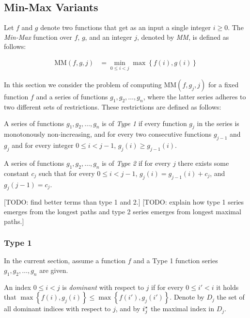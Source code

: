 \subsection{Min-Max Variants}

Let $f$ and $g$ denote two functions that get as an input a single integer $i \geq 0$. The \emph{Min-Max} function over $f$, $g$, and an integer $j$, denoted by \emph{MM}, is defined as follows:

\begin{align}
	\text{MM}(f, g, j) &= \min_{0 \leq i < j} \max \left\{f(i), g(i)\right\}
	\label{eq:MM} %
\end{align}


In this section we consider the problem of computing MM$(f, g_j, j)$ 
for a fixed function $f$ and a series of functions $g_1, g_2, \ldots, g_n$, where the latter series adheres to two different sets of restrictions. These restrictions are defined as follows:

\begin{definition}
	\label{def:type1}
	A series of functions $g_1, g_2, \ldots, g_n$ is of \emph{Type 1} if every function $g_j$ in the series is monotonously non-increasing, and for every two consecutive functions $g_{j-1}$ and $g_j$ and for every integer $0 \leq i < j-1$, $g_j(i) \geq g_{j-1}(i)$.
\end{definition}

\begin{definition}
	\label{def:type2}
	A series of functions $g_1, g_2, \ldots, g_n$ is of \emph{Type 2} if for every $j$ there exists some constant $c_j$ such that for every $0 \leq i < j-1$, $g_j(i) = g_{j-1}(i) + c_j$, and $g_j(j-1) = c_j$. 
\end{definition}

[TODO: find better terms than type 1 and 2.]
[TODO: explain how type 1 series emerges from the longest paths and type 2 series emerges from longest maximal paths.]

\subsubsection{Type 1}
\label{sec:type1}

In the current section, assume a function $f$ and a Type 1 function series $g_1, g_2, \ldots, g_n$ are given.

\begin{definition}
\label{def:dominant}
	An index $0 \leq i < j$ is \emph{dominant} with respect to $j$ if for every $0 \leq i' < i$ it holds that $\max\left\{f(i), g_j(i)\right\} \leq \max\left\{f(i'), g_j(i')\right\}$. Denote by $D_j$ the set of all dominant indices with respect to $j$, and by  $i^\star_{j}$ the maximal index in $D_j$. 
\end{definition}

